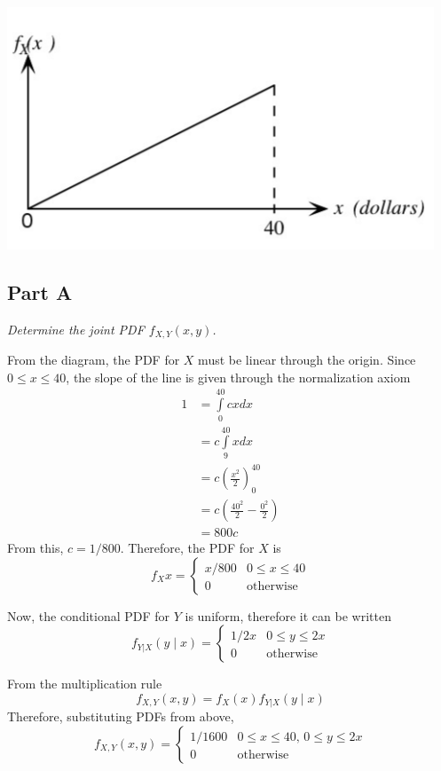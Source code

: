 \documentclass{article}
\begin{document}
\begin{center}
    \includegraphics[scale=1]{Images/P3.PNG}
\end{center}

\subsection*{Part A}

\textit{Determine the joint PDF $ f_{X,Y}(x, y) $.}

\bigbreak

From the diagram, the PDF for $X$ must be linear through the origin. Since $
0 \leq x \leq 40 $, the slope of the line is given through the normalization
axiom
\begin{align*}
    1 &= \int\limits_0^{40} c x dx \\
    &= c \int\limits_9^{40} x dx \\
    &= c \left( \frac{x^2}{2} \right)_0^{40} \\
    &= c \left( \frac{40^2}{2} - \frac{0^2}{2} \right) \\
    &= 800 c
\end{align*}
From this, $ c = 1/800 $.
Therefore, the PDF for $X$ is 
$$ f_X{x} = \begin{cases}
    x / 800 & 0 \leq x \leq 40 \\
    0 & \mathrm{otherwise}
\end{cases} $$

Now, the conditional PDF for $Y$ is uniform, therefore it can be written
$$ f_{Y|X}(y \mid x) = \begin{cases}
    1 / 2x & 0 \leq y \leq 2x \\
    0 & \mathrm{otherwise}
\end{cases} $$

From the multiplication rule
$$ f_{X,Y} (x, y) = f_X(x) f_{Y|X}(y \mid x) $$
Therefore, substituting PDFs from above,
$$ f_{X,Y} (x, y) = \begin{cases}
    1 / 1600 & 0 \leq x \leq 40,\, 0 \leq y \leq 2x \\
    0 & \mathrm{otherwise}
\end{cases} $$
\end{document}
